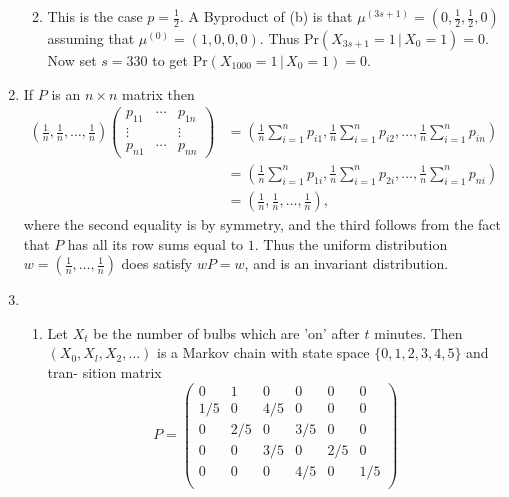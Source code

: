 \documentclass[11pt,a4paper]{article}
\begin{document}
\begin{enumerate}
\begin{enumerate}
$$            $$
            \item This is the case $p = \frac{1}{2}$. A Byproduct of (b) is that $\mu^{(3s+1)} = (0,\frac{1}{2}, \frac{1}{2},0)$ assuming that $\mu^{(0)} = (1, 0, 0, 0)$. Thus $\text{Pr}(X_{3s+1} = 1\, | \, X_0=1) = 0$.\\
            Now set $s = 330$ to get $\text{Pr}(X_{1000} = 1\, | \, X_0 = 1) = 0$.
        \end{enumerate}
        \item If $P$ is an $n \times n$ matrix then
        \begin{align*}
            \left(\frac{1}{n},\frac{1}{n},\ldots, \frac{1}{n}\right)
            \begin{pmatrix}
                p_{11} & \cdots & p_{1n}\\
                \vdots & &\vdots\\
                p_{n1} & \cdots & p_{nn}
            \end{pmatrix}
            &= \left(\frac{1}{n}\sum_{i=1}^n p_{i1},\frac{1}{n}\sum_{i=1}^n p_{i2},\ldots, \frac{1}{n}\sum_{i=1}^n p_{in}\right)\\
            &= \left(\frac{1}{n}\sum_{i=1}^n p_{1i},\frac{1}{n}\sum_{i=1}^n p_{2i},\ldots, \frac{1}{n}\sum_{i=1}^n p_{ni}\right)\\
            &= \left(\frac{1}{n},\frac{1}{n},\ldots, \frac{1}{n}\right),
        \end{align*}
        where the second equality is by symmetry, and the third follows from the fact that $P$ has all its row sums equal to $1$. Thus the uniform distribution $w = \left(\frac{1}{n},\ldots, \frac{1}{n}\right)$ does satisfy $wP = w$, and is an invariant distribution.
        \item
        \begin{enumerate}
            \item  Let $X_t$ be the number of bulbs which are 'on' after $t$ minutes. Then $(X_0, X_l,X_2, \ldots )$ is a Markov chain with state space $\{ 0, 1, 2, 3, 4, 5 \}$ and tran- sition matrix
            $$
            P
            =
            \begin{pmatrix}
                0 & 1 & 0 & 0 & 0 & 0\\
                1/5 & 0 & 4/5 & 0 & 0 & 0\\
                0 & 2/5 & 0 & 3/5 & 0 & 0\\
                0 & 0 & 3/5 & 0 & 2/5 & 0\\
                0 & 0 & 0 & 4/5 & 0 & 1/5\\

\end{pmatrix}$$
\end{enumerate}
\end{enumerate}
\end{document}
